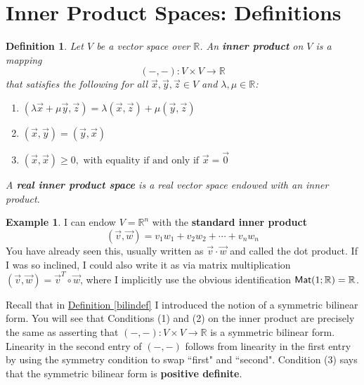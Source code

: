 \documentclass[11pt]{amsbook}
\newtheorem{definition}[theorem]{Definition}
\theoremstyle{definition}
\newtheorem{ex}[theorem]{Example}
\begin{document}
\section{Inner Product Spaces: Definitions}
\begin{definition} Let $V$ be a vector space over $\mathbb{R}$. An {\bf inner product} on $V$ is a mapping $$(- , -) : V\times V \to \mathbb{R}$$ that satisfies the following for all $\vec{x}, \vec{y}, \vec{z} \in V$ and $\lambda, \mu \in \mathbb{R}$:
\begin{enumerate}
\item $
(\lambda \vec{x} + \mu \vec{y}, \vec{z}) = \lambda (\vec{x}, \vec{z}) + \mu (\vec{y}, \vec{z}) $
\item $
(\vec{x} , \vec{y} ) = (\vec{y}, \vec{x}) $
\item $
(\vec{x}, \vec{x}) \geqslant 0, \text{ with equality if and only if } \vec{x} = \vec{0}$
\end{enumerate}
A {\bf real inner product space} is a real vector space endowed with an inner product.
\end{definition}

\begin{ex} \label{standardreal}
I can endow $V = \mathbb{R}^n$ with the {\bf standard inner product} $$(\vec{v}, \vec{w}) = v_1w_1 + v_2w_2 + \cdots + v_nw_n$$ You have already seen this, usually written as $\vec{v} \cdot \vec{w}$ and called the dot product. If I was so inclined, I could also write it as via matrix multiplication $(\vec{v}, \vec{w}) = \vec{v}^T \circ \vec{w}$, where I implicitly use the obvious identification ${\sf Mat}(1; \mathbb{R}) = \mathbb{R}$.
\end{ex}

Recall that in \hyperref[bilindef]{Definition \ref{bilindef}} I introduced the notion of a symmetric bilinear form. You will see that Conditions (1) and (2) on the inner product are precisely the same as asserting that $(-,-) : V\times V \to \mathbb{R}$ is a symmetric bilinear form. Linearity in the second entry of $(-,-)$ follows from linearity in the first entry by using the symmetry condition to swap ``first" and ``second". Condition (3) says that the symmetric bilinear form is {\bf positive definite}.
\end{document}

